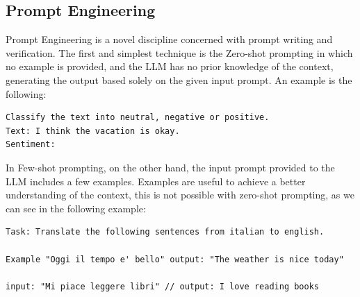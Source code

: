 \subsection{Prompt Engineering}
Prompt Engineering is a novel discipline concerned with prompt writing and verification.
The first and simplest technique is the Zero-shot prompting in which no example is provided, and the LLM has no prior knowledge of the context, generating the output based solely on the given input prompt.
An example is the following: 
\begin{lstlisting}
Classify the text into neutral, negative or positive. 
Text: I think the vacation is okay.
Sentiment:   
\end{lstlisting}
In Few-shot prompting, on the other hand, the input prompt provided to the LLM includes a few examples. Examples are useful to achieve a better understanding of the context, this is not possible with zero-shot prompting, as we can see in the following example:
\begin{lstlisting}
Task: Translate the following sentences from italian to english.

Example "Oggi il tempo e' bello" output: "The weather is nice today"

input: "Mi piace leggere libri" // output: I love reading books
\end{lstlisting}

